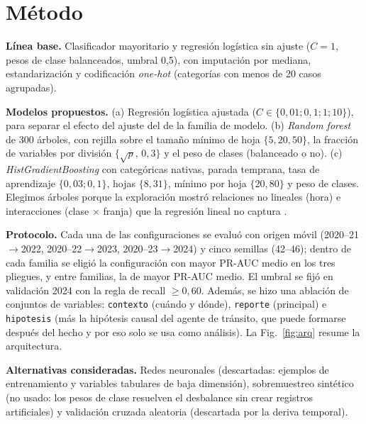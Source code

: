 \documentclass[conference]{IEEEtran}
\begin{document}
\section{Método}
\textbf{Línea base.} Clasificador mayoritario y regresión logística sin ajuste ($C=1$, pesos de clase balanceados, umbral 0,5),
con imputación por mediana, estandarización y codificación \emph{one-hot} (categorías con menos de 20 casos agrupadas).

\textbf{Modelos propuestos.} (a) Regresión logística ajustada ($C\in\{0{,}01;0{,}1;1;10\}$), para separar el efecto del ajuste del
de la familia de modelo. (b) \emph{Random forest} \cite{breiman2001rf} de 300 árboles, con rejilla sobre el tamaño mínimo de hoja
$\{5,20,50\}$, la fracción de variables por división $\{\sqrt{p},\,0{,}3\}$ y el peso de clases (balanceado o no). (c)
\emph{HistGradientBoosting} \cite{ke2017lightgbm,pedregosa2011sklearn} con categóricas nativas, parada temprana, tasa de
aprendizaje $\{0{,}03;0{,}1\}$, hojas $\{8,31\}$, mínimo por hoja $\{20,80\}$ y peso de clases. Elegimos árboles porque la
exploración mostró relaciones no lineales (hora) e interacciones (clase $\times$ franja) que la regresión lineal no captura
\cite{russell2020aima}.

\textbf{Protocolo.} Cada una de las \CifraNConfig{} configuraciones se evaluó con origen móvil
\cite{tashman2000outofsample} (2020--21$\to$2022, 2020--22$\to$2023, 2020--23$\to$2024) y cinco semillas (42--46); dentro de cada
familia se eligió la configuración con mayor PR-AUC medio en los tres pliegues, y entre familias, la de mayor PR-AUC medio. El
umbral se fijó en validación 2024 con la regla de recall $\geq 0{,}60$. Además, se hizo una ablación de conjuntos de variables:
\texttt{contexto} (cuándo y dónde), \texttt{reporte} (principal) e \texttt{hipotesis} (más la hipótesis causal del agente de
tránsito, que puede formarse después del hecho y por eso solo se usa como análisis). La Fig.~\ref{fig:arq} resume la arquitectura.

\textbf{Alternativas consideradas.} Redes neuronales (descartadas: \CifraNTrain{} ejemplos de entrenamiento y variables tabulares
de baja dimensión), sobremuestreo sintético (no usado: los pesos de clase resuelven el desbalance sin crear registros artificiales)
y validación cruzada aleatoria (descartada por la deriva temporal).
\end{document}
